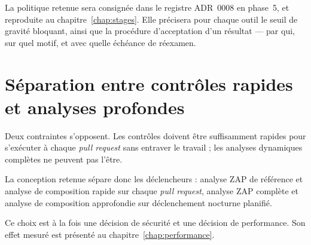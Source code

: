 La politique retenue sera consignée dans le registre ADR~0008 en phase~5, et
reproduite au chapitre~\ref{chap:stages}. Elle précisera pour chaque outil le
seuil de gravité bloquant, ainsi que la procédure d'acceptation d'un résultat
--- par qui, sur quel motif, et avec quelle échéance de réexamen.

\section{Séparation entre contrôles rapides et analyses profondes}

Deux contraintes s'opposent. Les contrôles doivent être suffisamment rapides
pour s'exécuter à chaque \emph{pull request} sans entraver le travail ; les
analyses dynamiques complètes ne peuvent pas l'être.

La conception retenue sépare donc les déclencheurs : analyse ZAP de référence et
analyse de composition rapide sur chaque \emph{pull request}, analyse ZAP
complète et analyse de composition approfondie sur déclenchement nocturne
planifié.

Ce choix est à la fois une décision de sécurité et une décision de performance.
Son effet mesuré est présenté au chapitre~\ref{chap:performance}.
